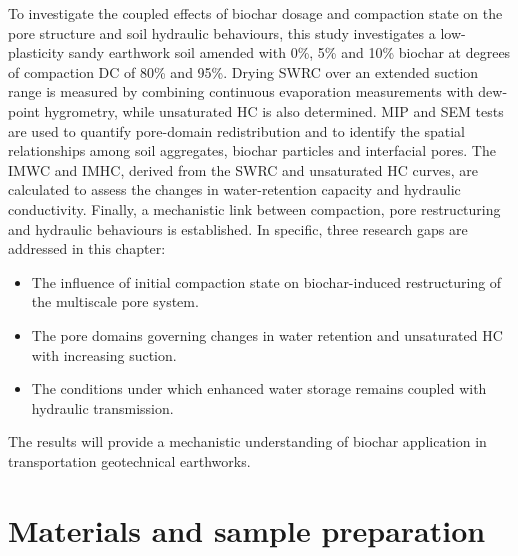 To investigate the coupled effects of biochar dosage and compaction state on the pore structure and soil hydraulic behaviours, this study investigates a low-plasticity sandy earthwork soil amended with 0\%, 5\% and 10\% biochar at degrees of compaction \ac{DC} of 80\% and 95\%. Drying \ac{SWRC} over an extended suction range is measured by combining continuous evaporation measurements with dew-point hygrometry, while unsaturated \ac{HC} is also determined. \Ac{MIP} and \ac{SEM} tests are used to quantify pore-domain redistribution and to identify the spatial relationships among soil aggregates, biochar particles and interfacial pores. The \ac{IMWC} and \ac{IMHC}, derived from the \ac{SWRC} and unsaturated \ac{HC} curves, are calculated to assess the changes in water-retention capacity and hydraulic conductivity. Finally, a mechanistic link between compaction, pore restructuring and hydraulic behaviours is established. In specific, three research gaps are addressed in this chapter:
\begin{itemize}
    \item The influence of initial compaction state on biochar-induced restructuring of the multiscale pore system.
     \item The pore domains governing changes in water retention and unsaturated \ac{HC} with increasing suction.
     \item The conditions under which enhanced water storage remains coupled with hydraulic transmission.
\end{itemize} 
The results will provide a mechanistic understanding of biochar application in transportation geotechnical earthworks.\par

\section{Materials and sample preparation}
